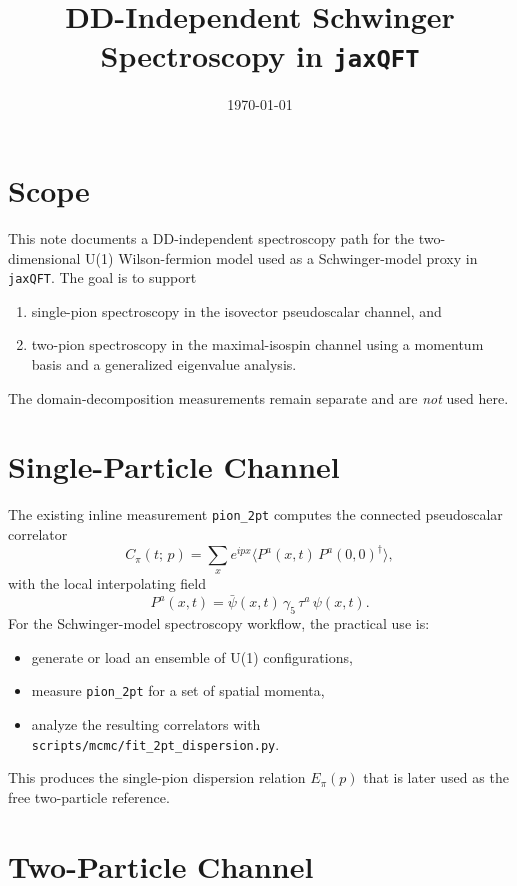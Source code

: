 \documentclass[11pt]{article}
\title{DD-Independent Schwinger Spectroscopy in \texttt{jaxQFT}}
\author{}
\date{\today}
\begin{document}
\maketitle

\section{Scope}
This note documents a DD-independent spectroscopy path for the two-dimensional
U(1) Wilson-fermion model used as a Schwinger-model proxy in
\texttt{jaxQFT}. The goal is to support
\begin{enumerate}
  \item single-pion spectroscopy in the isovector pseudoscalar channel, and
  \item two-pion spectroscopy in the maximal-isospin channel using a momentum
  basis and a generalized eigenvalue analysis.
\end{enumerate}
The domain-decomposition measurements remain separate and are \emph{not} used
here.

\section{Single-Particle Channel}
The existing inline measurement
\texttt{pion\_2pt} computes the connected pseudoscalar correlator
\begin{equation}
  C_{\pi}(t;\,p) =
  \sum_x e^{ipx}
  \langle P^a(x,t)\,P^a(0,0)^\dagger \rangle,
\end{equation}
with the local interpolating field
\begin{equation}
  P^a(x,t) = \bar\psi(x,t)\,\gamma_5\,\tau^a\,\psi(x,t).
\end{equation}
For the Schwinger-model spectroscopy workflow, the practical use is:
\begin{itemize}
  \item generate or load an ensemble of U(1) configurations,
  \item measure \texttt{pion\_2pt} for a set of spatial momenta,
  \item analyze the resulting correlators with
  \texttt{scripts/mcmc/fit\_2pt\_dispersion.py}.
\end{itemize}
This produces the single-pion dispersion relation $E_\pi(p)$ that is later used
as the free two-particle reference.

\section{Two-Particle Channel}
\end{document}
